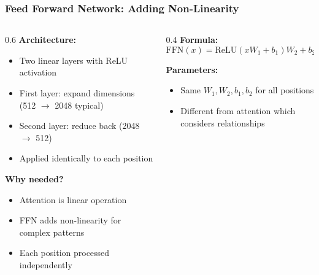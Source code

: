 \begin{frame}[fragile]\frametitle{Feed Forward Network: Adding Non-Linearity}

\begin{columns}
  \begin{column}[T]{0.6\linewidth}
    \textbf{Architecture:}
    \begin{itemize}
    \item Two linear layers with ReLU activation
    \item First layer: expand dimensions (512 $\rightarrow$ 2048 typical)
    \item Second layer: reduce back (2048 $\rightarrow$ 512)
    \item Applied identically to each position
    \end{itemize}
    
    \textbf{Why needed?}
    \begin{itemize}
    \item Attention is linear operation
    \item FFN adds non-linearity for complex patterns
    \item Each position processed independently
    \end{itemize}
  \end{column}
  \begin{column}[T]{0.4\linewidth}
    \textbf{Formula:}
    $$\text{FFN}(x) = \text{ReLU}(xW_1 + b_1)W_2 + b_2$$
    
    \textbf{Parameters:}
    \begin{itemize}
    \item Same $W_1, W_2, b_1, b_2$ for all positions
    \item Different from attention which considers relationships
    \end{itemize}
  \end{column}
\end{columns}
\end{frame}

